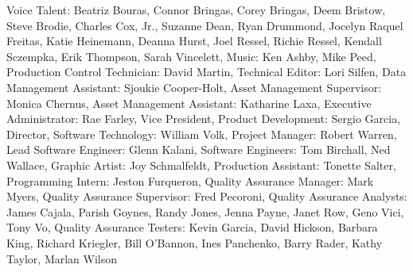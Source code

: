 Voice Talent: Beatriz Bouras, Connor Bringas, Corey Bringas, Deem Bristow, Steve Brodie, Charles Cox, Jr., Suzanne Dean, Ryan Drummond, Jocelyn Raquel Freitas, Katie Heinemann, Deanna Hurst, Joel Ressel, Richie Ressel, Kendall Sczempka, Erik Thompson, Sarah Vincelett,
Music: Ken Ashby, Mike Peed,
Production Control Technician: David Martin,
Technical Editor: Lori Silfen,
Data Management Assistant: Sjoukie Cooper-Holt,
Asset Management Supervisor: Monica Chernus,
Asset Management Assistant: Katharine Laxa,
Executive Administrator: Rae Farley,
Vice President, Product Development: Sergio Garcia,
Director, Software Technology: William Volk,
Project Manager: Robert Warren,
Lead Software Engineer: Glenn Kalani,
Software Engineers: Tom Birchall, Ned Wallace,
Graphic Artist: Joy Schmalfeldt,
Production Assistant: Tonette Salter,
Programming Intern: Jeston Furqueron,
Quality Assurance Manager: Mark Myers,
Quality Assurance Supervisor: Fred Pecoroni,
Quality Assurance Analysts: James Cajala, Parish Goynes, Randy Jones, Jenna Payne, Janet Row, Geno Vici, Tony Vo,
Quality Assurance Testers: Kevin Garcia, David Hickson, Barbara King, Richard Kriegler, Bill O'Bannon, Ines Panchenko, Barry Rader, Kathy Taylor, Marlan Wilson
